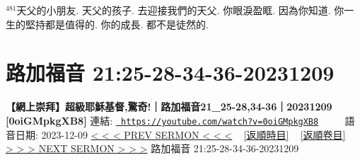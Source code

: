 \documentclass{book}
\begin{document}
$^{481}$天父的小朋友.
天父的孩子.
去迎接我們的天父.
你眼淚盈眶.
因為你知道.
你一生的堅持都是值得的.
你的成長.
都不是徒然的.
\newpage



\section{路加福音 21:25-28-34-36-20231209}
\label{sec:0oiGMpkgXB8}
\textbf{【網上崇拜】超級耶穌基督,驚奇!｜路加福音21\_25-28,34-36｜20231209 [0oiGMpkgXB8]}
\newline
\newline
連結: \href{https://youtube.com/watch?v=0oiGMpkgXB8}{\texttt{ https://youtube.com/watch?v=0oiGMpkgXB8}} ~~~~ 語音日期: 2023-12-09 
\newline
\newline
\hyperref[sec:lfg8MyM5M04]{\small{< < < PREV SERMON < < <}}
~
\hyperref[sec:index_chronic]{\small{[返順時目]}}
~
\hyperref[sec:index_scriptual]{\small{[返順卷目]}}
~
\hyperref[sec:sKBDQD8UIMg]{\small{> > > NEXT SERMON > > >}}
\newline
\newline
路加福音 21:25-28-34-36-20231209
\newline
\end{document}
